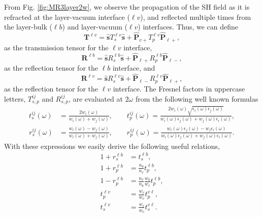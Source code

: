 From Fig. \ref{fig:MR3layer2w}, we observe the propagation of the SH field as it
is refracted at the layer-vacuum interface ($\ell v$), and  reflected multiple
times from the layer-bulk ($\ell b$) and layer-vacuum ($\ell v$) interfaces.
Thus, we can define
\begin{equation}\label{eq:r5}
\mathbf{T}^{\ell v}
= \hat{\mathbf{s}}T_{s}^{\ell v}\hat{\mathbf{s}} 
+ \hat{\mathbf{P}}_{v+}T_{p}^{\ell v} \hat{\mathbf{P}}_{\ell +},
\end{equation}
as the transmission tensor for the $\ell v$ interface,
\begin{equation}\label{eq:r6}
\mathbf{R}^{\ell b}
= \hat{\mathbf{s}}R_{s}^{\ell b}\hat{\mathbf{s}}
+ \hat{\mathbf{P}}_{\ell +}R_{p}^{\ell b} \hat{\mathbf{P}}_{\ell -},
\end{equation} 
as the reflection tensor for the $\ell b$ interface, and
\begin{equation}\label{eq:r6b}
\mathbf{R}^{\ell v}
= \hat{\mathbf{s}}R_{s}^{\ell v}\hat{\mathbf{s}}
+ \hat{\mathbf{P}}_{\ell -}R_{p}^{\ell v} \hat{\mathbf{P}}_{\ell +},
\end{equation} 
as the reflection tensor for the $\ell v$ interface. The Fresnel factors in
uppercase letters, $T^{ij}_{s,p}$ and $R^{ij}_{s,p}$, are evaluated at $2\omega$
from the following well known formulas \cite{jacksonbook}
\begin{equation}\label{eq:e.f1}
\begin{split}
t_{s}^{ij}(\omega) &=
\frac{2w_{i}(\omega)}{w_{i}(\omega) + w_{j}(\omega)},
\quad\quad  
t_{p}^{ij}(\omega) =
\frac{2w_{i}(\omega)\sqrt{\epsilon_{i}(\omega)\epsilon_j(\omega)}}
     {w_{i}(\omega)\epsilon_{j}(\omega) + w_{j}(\omega)\epsilon_{i}(\omega)},\\
r_{s}^{ij}(\omega) &=
\frac{w_{i}(\omega) - w_{j}(\omega)}
     {w_{i}(\omega) + w_{j}(\omega)},
\quad\quad 
r_{p}^{ij}(\omega) =
\frac{w_{i}(\omega)\epsilon_{j}(\omega) - w_{j}\epsilon_{i}(\omega)}
     {w_{i}(\omega)\epsilon_{j}(\omega) + w_{j}(\omega)\epsilon_{i}(\omega)}. 
\end{split}
\end{equation}
With these expressions we easily derive the following useful relations,
\begin{equation}\label{eq:mf}
\begin{split}
1 + r^{\ell b}_{s} &= t^{\ell b}_{s},\\
1 + r^{\ell b}_{p} &= \frac{n_{b}}{n_{\ell}}t^{\ell b}_{p},\\
1 - r^{\ell b}_{p} &= \frac{n_{\ell}}{n_{b}}\frac{w_{b}}{w_{\ell}}
                      t^{\ell b}_{p},\\
t^{\ell v}_{p} &= \frac{w_{\ell}}{w_{v}}t^{v\ell}_{p},\\
t^{\ell v}_{s} &= \frac{w_{\ell}}{w_{v}}t^{v\ell}_{s}.
\end{split}
\end{equation}


